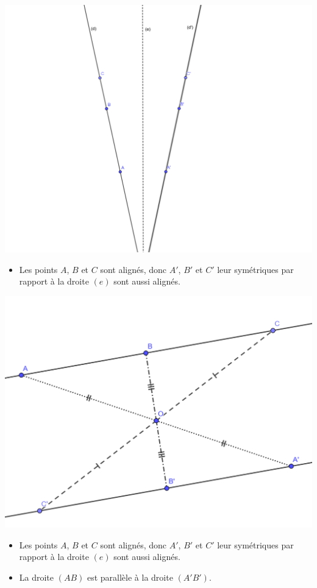 \documentclass[12pt,a4paper]{article}
\begin{document}
\begin{myexs}
	\begin{multicols}{2}
		\begin{center}
			\includegraphics[scale=0.1]{sym_droites1}
		\end{center}

		\begin{itemize}
			\item Les points $A$, $B$ et $C$ sont alignés, donc $A'$, $B'$ et $C'$ leur symétriques par rapport à la droite $(e)$ sont aussi alignés.
		\end{itemize}	
		
		\begin{center}
			\includegraphics[scale=0.2]{sym_droites2}
		\end{center}
	
		\begin{itemize}
			\item Les points $A$, $B$ et $C$ sont alignés, donc $A'$, $B'$ et $C'$ leur symétriques par rapport à la droite $(e)$ sont aussi alignés.
			\item La droite $(AB)$ est parallèle à la droite $(A'B')$.
		\end{itemize}
	\end{multicols}
\end{myexs}
\end{document}
